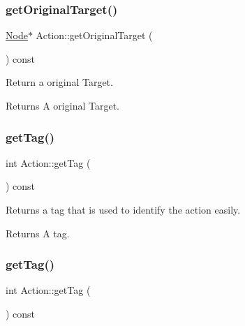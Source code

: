 \subsubsection{\texorpdfstring{get\+Original\+Target()}{getOriginalTarget()}\hspace{0.1cm}{\footnotesize\ttfamily [2/2]}}
{\footnotesize\ttfamily \hyperlink{classNode}{Node}$\ast$ Action\+::get\+Original\+Target (\begin{DoxyParamCaption}{ }\end{DoxyParamCaption}) const\hspace{0.3cm}{\ttfamily [inline]}}

Return a original Target.

\begin{DoxyReturn}{Returns}
A original Target. 
\end{DoxyReturn}
\mbox{\label{classAction_a1f090a477cab2dbc8175385c66b91c31}} 
\subsubsection{\texorpdfstring{get\+Tag()}{getTag()}\hspace{0.1cm}{\footnotesize\ttfamily [1/2]}}
{\footnotesize\ttfamily int Action\+::get\+Tag (\begin{DoxyParamCaption}{ }\end{DoxyParamCaption}) const\hspace{0.3cm}{\ttfamily [inline]}}

Returns a tag that is used to identify the action easily.

\begin{DoxyReturn}{Returns}
A tag. 
\end{DoxyReturn}
\mbox{\label{classAction_a1f090a477cab2dbc8175385c66b91c31}} 
\subsubsection{\texorpdfstring{get\+Tag()}{getTag()}\hspace{0.1cm}{\footnotesize\ttfamily [2/2]}}
{\footnotesize\ttfamily int Action\+::get\+Tag (\begin{DoxyParamCaption}{ }\end{DoxyParamCaption}) const\hspace{0.3cm}{\ttfamily [inline]}}

